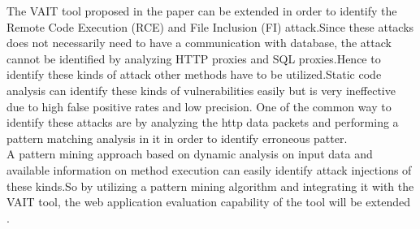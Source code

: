 \newline
The VAIT tool proposed in the paper can be extended in order to identify the Remote Code Execution (RCE) and File Inclusion (FI) attack.Since these attacks does not necessarily need to have a communication with database, the attack cannot be identified by analyzing HTTP proxies and SQL proxies.Hence to identify these kinds of attack other methods have to be utilized.Static code analysis can identify these kinds of vulnerabilities easily but is very ineffective due to high false positive rates and low precision. One of the common way to identify these attacks are by analyzing the http data packets and performing a pattern matching analysis in it in order to identify erroneous patter.\\
\newline
A pattern mining approach based on dynamic analysis on input data and available information on method execution can easily identify attack injections of these kinds.So by utilizing a pattern mining algorithm and integrating it with the VAIT tool, the web application evaluation capability of the tool will be extended .




